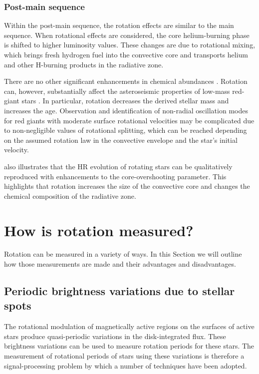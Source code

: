 \subsubsection{Post-main sequence}
Within the post-main sequence, the rotation effects are similar to the main sequence.
When rotational effects are considered, the core helium-burning phase is shifted to higher luminosity values. 
These changes are due to rotational mixing, which brings fresh hydrogen fuel into the convective core and transports helium and other H-burning products in the radiative zone.

There are no other significant enhancements in chemical abundances \citep[See Table 2. in][]{lagarde_thermohaline_2012}.
Rotation can, however, substantially affect the asteroseismic properties of low-mass red-giant stars
\citet{lagarde_thermohaline_2012, eggenberger_effects_2010}.
In particular, rotation decreases the derived stellar mass and increases the age.
Observation and identification of non-radial oscillation modes for red giants with moderate surface rotational velocities may be complicated due to non-negligible values of rotational splitting, which can be reached depending on the assumed rotation law in the convective envelope and the star's initial velocity.

\citep{eggenberger_effects_2010, lagarde_thermohaline_2012} also illustrates that the HR evolution of rotating stars can be qualitatively reproduced with enhancements to the core-overshooting parameter. 
This highlights that rotation increases the size of the convective core and changes the chemical composition of the radiative zone.


\section{How is rotation measured?}
\label{sec:how_rot_measured}


Rotation can be measured in a variety of ways.
In this Section we will outline how those measurements are made and their advantages and disadvantages.

\subsection{Periodic brightness variations due to stellar spots}
\label{sec:periodic_brightness_meas}

The rotational modulation of magnetically active regions on the surfaces of active stars produce quasi-periodic variations in the disk-integrated flux.
These brightness variations can be used to measure rotation periods for these stars.
The measurement of rotational periods of stars using these variations is therefore a signal-processing problem by which a number of techniques have been adopted.

